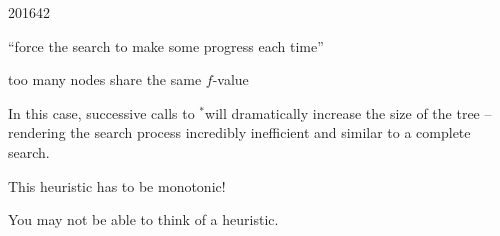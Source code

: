 \documentclass[10pt,\jkfside,a4paper]{article}
\newcommand{\idastar}{\text{IDA}\ensuremath{^*}}
\begin{document}
\begin{examquestion}{2016}{4}{2}
\begin{enumerate}[label=(\alph*)]
\begin{itemize}
{\begin{itemize}
``force the search to make some progress each time''

\end{itemize}
}

\item too many nodes share the same $f$-value

In this case, successive calls to \idastar will dramatically increase the
size of the tree -- rendering the search process incredibly inefficient and
similar to a complete search.

{\color{blue}

\item This heuristic has to be monotonic!

\item You may not be able to think of a heuristic.

}

\end{itemize}

\end{enumerate}

\end{examquestion}
\end{document}
